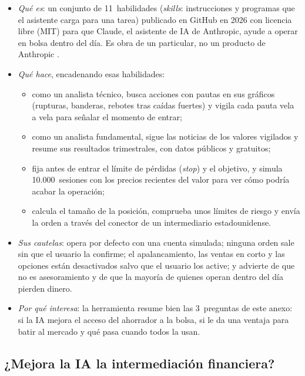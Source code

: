 \documentclass[11pt]{article}
\begin{document}
\begin{itemize}
\item \emph{Qué es}: un conjunto de 11~habilidades (\emph{skills}: instrucciones y programas que el asistente carga para una tarea) publicado en GitHub en 2026 con licencia libre (MIT) para que Claude, el asistente de IA de Anthropic, ayude a operar en bolsa dentro del día. Es obra de un particular, no un producto de Anthropic \parencite{Schincariol2026DayTrader}.
\item \emph{Qué hace}, encadenando esas habilidades:
  \begin{itemize}
  \item como un analista técnico, busca acciones con pautas en sus gráficos (rupturas, banderas, rebotes tras caídas fuertes) y vigila cada pauta vela a vela para señalar el momento de entrar;
  \item como un analista fundamental, sigue las noticias de los valores vigilados y resume sus resultados trimestrales, con datos públicos y gratuitos;
  \item fija antes de entrar el límite de pérdidas (\emph{stop}) y el objetivo, y simula 10.000~sesiones con los precios recientes del valor para ver cómo podría acabar la operación;
  \item calcula el tamaño de la posición, comprueba unos límites de riesgo y envía la orden a través del conector de un intermediario estadounidense.
  \end{itemize}
\item \emph{Sus cautelas}: opera por defecto con una cuenta simulada; ninguna orden sale sin que el usuario la confirme; el apalancamiento, las ventas en corto y las opciones están desactivados salvo que el usuario los active; y advierte de que no es asesoramiento y de que la mayoría de quienes operan dentro del día pierden dinero.
\item \emph{Por qué interesa}: la herramienta resume bien las 3~preguntas de este anexo: si la IA mejora el acceso del ahorrador a la bolsa, si le da una ventaja para batir al mercado y qué pasa cuando todos la usan.
\end{itemize}

\subsection{¿Mejora la IA la intermediación financiera?}
\end{document}
